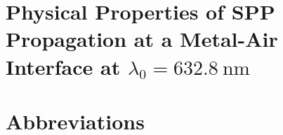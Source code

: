 \documentclass[a4paper]{report}
\begin{document}



\appendix
\section{Physical Properties of SPP Propagation at a Metal-Air Interface at $\lambda_0=\SI{632.8}{\nano\meter}$}

%
%

%

\section{Abbreviations}
%
\end{document}
